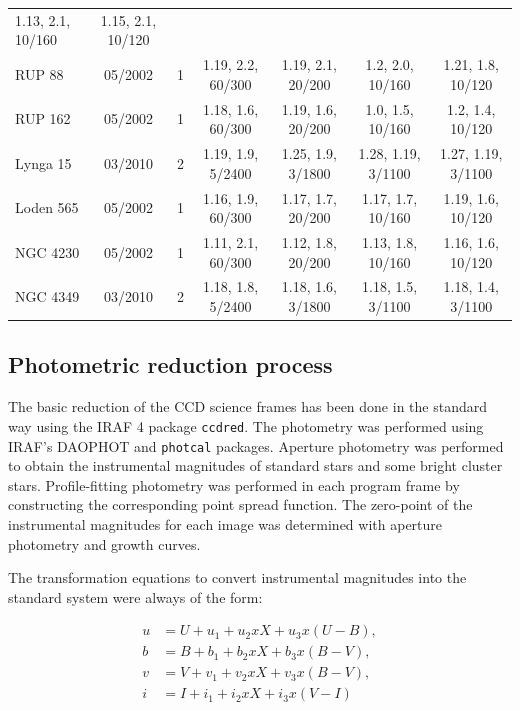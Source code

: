 \documentclass[draft]{aa}
\begin{document}
\begin{table}[ht]
\begin{tabular}{lcccccc}
        1.13, 2.1, 10/160 & 1.15, 2.1, 10/120\\
        RUP 88    & 05/2002 & 1 & 1.19, 2.2, 60/300 & 1.19, 2.1, 20/200 &
        1.2, 2.0, 10/160 & 1.21, 1.8, 10/120\\
        RUP 162   & 05/2002 & 1 & 1.18, 1.6, 60/300 & 1.19, 1.6, 20/200 &
        1.0, 1.5, 10/160 & 1.2, 1.4, 10/120\\
        Lynga 15  & 03/2010 & 2 & 1.19, 1.9, 5/2400 & 1.25, 1.9, 3/1800 &
        1.28, 1.19, 3/1100 & 1.27, 1.19, 3/1100\\
        Loden 565 & 05/2002 & 1 & 1.16, 1.9, 60/300 & 1.17, 1.7, 20/200 &
        1.17, 1.7, 10/160 & 1.19, 1.6, 10/120\\
        NGC 4230  & 05/2002 & 1 & 1.11, 2.1, 60/300 & 1.12, 1.8, 20/200 &
        1.13, 1.8, 10/160 & 1.16, 1.6, 10/120\\
        NGC 4349  & 03/2010 & 2 & 1.18, 1.8, 5/2400 & 1.18, 1.6, 3/1800 &
        1.18, 1.5, 3/1100 & 1.18, 1.4, 3/1100\\
        \hline
    \end{tabular}
    \label{tab:log_yalo}
\end{table}




\subsection{Photometric reduction process}
\label{ssec:photom_reduc}

The basic reduction of the CCD science frames has been done in the standard way
using the IRAF 4 package \texttt{ccdred}. The photometry was performed using
IRAF's DAOPHOT \citep{Stetson_1987,Stetson_1990} and \texttt{photcal} packages.
Aperture photometry was performed to obtain the instrumental magnitudes of
standard stars and some bright cluster stars. Profile-fitting photometry was
performed in each program frame by constructing the corresponding point spread
function. The zero-point of the instrumental magnitudes for each image was
determined with aperture photometry and growth curves.

The transformation equations to convert instrumental magnitudes into the
standard system were always of the form:

\begin{equation}
\begin{aligned}
  u  &=  U+u_1+u_2xX+u_3x(U-B), \\
  b  &=  B+b_1+b_2xX+b_3x(B-V), \\
  v  &=  V+v_1+v_2xX+v_3x(B-V), \\
  i  &=  I+i_1+i_2xX+i_3x(V-I)
\end{aligned}
\end{equation}
\end{document}
